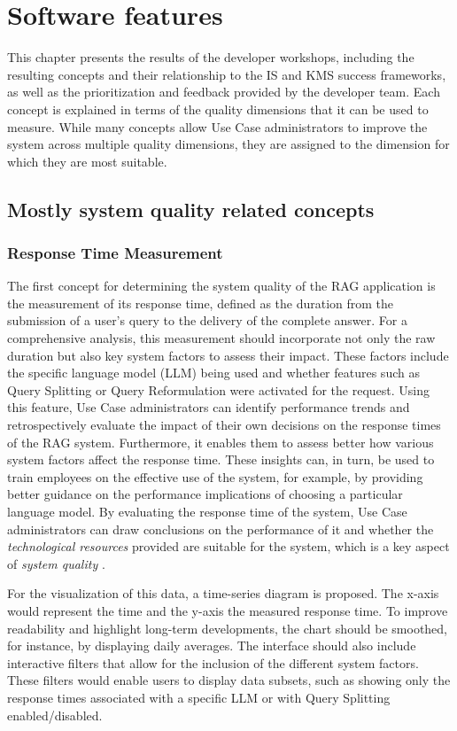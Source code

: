 \documentclass[
	english,
	ruledheaders=section,%
	class=report,%
	thesis={type=bachelor},%
	accentcolor=1b,%
	custommargins=true,%
	marginpar=false,%
	parskip=half-,%
	fontsize=11pt,%
	DIV=14,
]{tudapub}
\begin{document}
\section{Software features}
This chapter presents the results of the developer workshops, including the resulting concepts and their relationship to the IS \parencite{DeloneMcLean2003ISSuccessTenYearUpdate} and KMS success \parencite{Jennex2006} frameworks, as well as the prioritization and feedback provided by the developer team. Each concept is explained in terms of the quality dimensions that it can be used to measure. While many concepts allow Use Case administrators to improve the system across multiple quality dimensions, they are assigned to the dimension for which they are most suitable.
\subsection{Mostly system quality related concepts}
\subsubsection{Response Time Measurement}
The first concept for determining the system quality of the RAG application is the measurement of its response time, defined as the duration from the submission of a user's query to the delivery of the complete answer. For a comprehensive analysis, this measurement should incorporate not only the raw duration but also key system factors to assess their impact. These factors include the specific language model (LLM) being used and whether features such as Query Splitting or Query Reformulation were activated for the request. Using this feature, Use Case administrators can identify performance trends and retrospectively evaluate the impact of their own decisions on the response times of the RAG system. Furthermore, it enables them to assess better how various system factors affect the response time. These insights can, in turn, be used to train employees on the effective use of the system, for example, by providing better guidance on the performance implications of choosing a particular language model. By evaluating the response time of the system, Use Case administrators can draw conclusions on the performance of it and whether the \textit{technological resources} provided are suitable for the system, which is a key aspect of \textit{system quality} \parencite[p.~56--57]{Jennex2006}.

For the visualization of this data, a time-series diagram is proposed. The x-axis would represent the time and the y-axis the measured response time. To improve readability and highlight long-term developments, the chart should be smoothed, for instance, by displaying daily averages. The interface should also include interactive filters that allow for the inclusion of the different system factors. These filters would enable users to display data subsets, such as showing only the response times associated with a specific LLM or with Query Splitting enabled/disabled.
\end{document}
